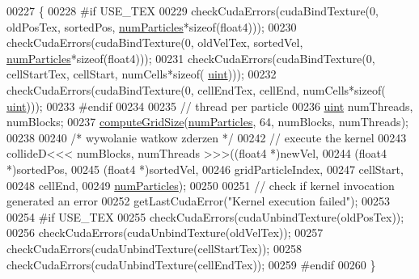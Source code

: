 \begin{DoxyCode}
00227     \{
00228 \textcolor{preprocessor}{#if USE\_TEX}
00229 \textcolor{preprocessor}{}        checkCudaErrors(cudaBindTexture(0, oldPosTex, sortedPos, \hyperlink{particles_8cpp_a05b8a90212054a3eb1a036ae0c269596}{numParticles}*\textcolor{keyword}{sizeof}(float4)));
00230         checkCudaErrors(cudaBindTexture(0, oldVelTex, sortedVel, \hyperlink{particles_8cpp_a05b8a90212054a3eb1a036ae0c269596}{numParticles}*\textcolor{keyword}{sizeof}(float4)));
00231         checkCudaErrors(cudaBindTexture(0, cellStartTex, cellStart, numCells*\textcolor{keyword}{sizeof}(
      \hyperlink{particles__kernel_8cuh_a91ad9478d81a7aaf2593e8d9c3d06a14}{uint})));
00232         checkCudaErrors(cudaBindTexture(0, cellEndTex, cellEnd, numCells*\textcolor{keyword}{sizeof}(
      \hyperlink{particles__kernel_8cuh_a91ad9478d81a7aaf2593e8d9c3d06a14}{uint})));
00233 \textcolor{preprocessor}{#endif}
00234 \textcolor{preprocessor}{}
00235         \textcolor{comment}{// thread per particle}
00236         \hyperlink{particles__kernel_8cuh_a91ad9478d81a7aaf2593e8d9c3d06a14}{uint} numThreads, numBlocks;
00237         \hyperlink{particle_system__cuda_8cu_a78e8aa50e0629b57cff219a2fa753ed0}{computeGridSize}(\hyperlink{particles_8cpp_a05b8a90212054a3eb1a036ae0c269596}{numParticles}, 64, numBlocks, numThreads);
00238 
00240 \textcolor{comment}{/*      wywolanie watkow zderzen        */}
00242         \textcolor{comment}{// execute the kernel}
00243         collideD<<< numBlocks, numThreads >>>((float4 *)newVel,
00244                                               (float4 *)sortedPos,
00245                                               (float4 *)sortedVel,
00246                                               gridParticleIndex,
00247                                               cellStart,
00248                                               cellEnd,
00249                                               \hyperlink{particles_8cpp_a05b8a90212054a3eb1a036ae0c269596}{numParticles});
00250 
00251         \textcolor{comment}{// check if kernel invocation generated an error}
00252         getLastCudaError("Kernel execution failed");
00253 
00254 \textcolor{preprocessor}{#if USE\_TEX}
00255 \textcolor{preprocessor}{}        checkCudaErrors(cudaUnbindTexture(oldPosTex));
00256         checkCudaErrors(cudaUnbindTexture(oldVelTex));
00257         checkCudaErrors(cudaUnbindTexture(cellStartTex));
00258         checkCudaErrors(cudaUnbindTexture(cellEndTex));
00259 \textcolor{preprocessor}{#endif}
00260 \textcolor{preprocessor}{}    \}
\end{DoxyCode}


